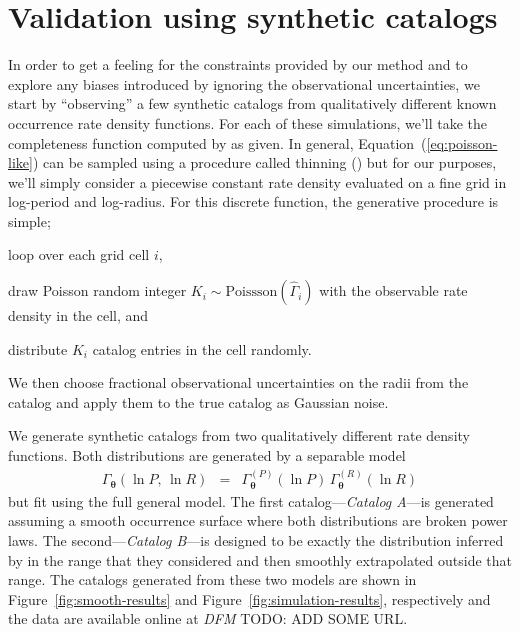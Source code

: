 \documentclass[12pt,preprint]{aastex}
\newcommand{\figref}[1]{\ref{fig:#1}}
\newcommand{\Fig}[1]{Figure~\figref{#1}}
\newcommand{\fig}[1]{\Fig{#1}}
\newcommand{\Eq}[1]{Equation~(\ref{eq:#1})}
\newcommand{\eq}[1]{\Eq{#1}}
\newcommand{\sectlabel}[1]{\label{sect:#1}}
\newcommand{\bvec}[1]{\ensuremath{\boldsymbol{#1}}}
\newcommand{\todo}[3]{{\color{#2} \emph{#1} TODO: #3}}
\newcommand{\dfmtodo}[1]{\todo{DFM}{red}{#1}}
\newcommand{\rate}{\ensuremath{\Gamma}}
\newcommand{\ratepar}{{\ensuremath{\theta}}}
\newcommand{\ratepars}{{\ensuremath{\bvec{\ratepar}}}}
\newcommand{\obs}[1]{\ensuremath{\hat{#1}}}
\newcommand{\radius}{\ensuremath{R}}
\newcommand{\period}{\ensuremath{P}}
\newcommand{\modela}{\emph{Catalog A}}
\newcommand{\modelb}{\emph{Catalog B}}
\begin{document}
\section{Validation using synthetic catalogs}
\sectlabel{valid}

In order to get a feeling for the constraints provided by our method and to
explore any biases introduced by ignoring the observational uncertainties, we
start by ``observing'' a few synthetic catalogs from qualitatively different
known occurrence rate density functions.
For each of these simulations, we'll take the completeness function computed
by \citet{petigura} as given.
In general, \eq{poisson-like} can be sampled using a procedure called thinning
(\citealt{poisson}) but for our purposes, we'll simply consider a piecewise
constant rate density evaluated on a fine grid in log-period and log-radius.
For this discrete function, the generative procedure is simple;
\begin{enumerate}
{\item loop over each grid cell $i$,}
{\item draw Poisson random integer $K_i\sim\mathrm{Poissson}(\obs{\rate}_i)$
with the observable rate density in the cell, and}
{\item distribute $K_i$ catalog entries in the cell randomly.}
\end{enumerate}
We then choose fractional observational uncertainties on the radii from the
\citet{petigura} catalog and apply them to the true catalog as Gaussian noise.

We generate synthetic catalogs from two qualitatively different rate density
functions.
Both distributions are generated by a separable model
\begin{eqnarray}
\rate_\ratepars (\ln\period,\,\ln\radius) &=&
    \rate_\ratepars^{(\period)}(\ln\period)\,
    \rate_\ratepars^{(\radius)}(\ln\radius)
\end{eqnarray}
but fit using the full general model.
The first catalog---\modela---is generated assuming a smooth occurrence
surface where both distributions are broken power laws.
The second---\modelb---is designed to be exactly the distribution inferred by
\citet{petigura} in the range that they considered and then smoothly
extrapolated outside that range.
The catalogs generated from these two models are shown in \fig{smooth-results}
and \fig{simulation-results}, respectively and the data are available online
at \dfmtodo{ADD SOME URL}.
\end{document}
